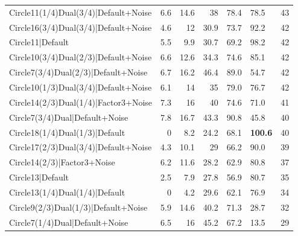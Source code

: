 \begin{tabular}{lrrrllr}
 Circle11(1/4)Dual(3/4)|Default+Noise &             6.6 &           14.6 &            38   & 78.4            & 78.5            &           43 \\
 Circle16(3/4)Dual(3/4)|Default+Noise &             4.6 &           12   &            30.9 & 73.7            & 92.2            &           42 \\
 Circle11|Default                     &             5.5 &            9.9 &            30.7 & 69.2            & 98.2            &           42 \\
 Circle10(3/4)Dual(2/3)|Default+Noise &             6.6 &           12.6 &            34.3 & 74.6            & 85.1            &           42 \\
 Circle7(3/4)Dual(2/3)|Default+Noise  &             6.7 &           16.2 &            46.4 & 89.0            & 54.7            &           42 \\
 Circle10(1/3)Dual(3/4)|Default+Noise &             6.1 &           14   &            35   & 79.0            & 76.7            &           42 \\
 Circle14(2/3)Dual(1/4)|Factor3+Noise &             7.3 &           16   &            40   & 74.6            & 71.0            &           41 \\
 Circle7(3/4)Dual|Default+Noise       &             7.8 &           16.7 &            43.3 & 90.8            & 45.8            &           40 \\
 Circle18(1/4)Dual(1/3)|Default       &             0   &            8.2 &            24.2 & 68.1            & \textbf{100.6}  &           40 \\
 Circle17(2/3)Dual(3/4)|Default+Noise &             4.3 &           10.1 &            29   & 66.2            & 90.0            &           39 \\
 Circle14(2/3)|Factor3+Noise          &             6.2 &           11.6 &            28.2 & 62.9            & 80.8            &           37 \\
 Circle13|Default                     &             2.5 &            7.9 &            27.8 & 56.9            & 80.7            &           35 \\
 Circle13(1/4)Dual(1/4)|Default       &             0   &            4.2 &            29.6 & 62.1            & 76.9            &           34 \\
 Circle9(2/3)Dual(1/3)|Default+Noise  &             5.9 &           14.6 &            40.2 & 71.3            & 28.7            &           32 \\
 Circle7(1/4)Dual|Default+Noise       &             6.5 &           16   &            45.2 & 67.2            & 13.5            &           29 \\

\end{tabular}

